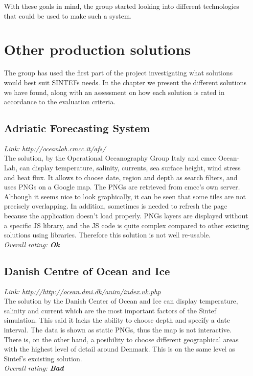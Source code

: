 \documentclass[11pt,a4paper,titlepage,oneside]{report}
\begin{document}
With these goals in mind, the group started looking into different technologies that could be used to make such a system.

\chapter{Other production solutions}
The group has used the first part of the project investigating what solutions would best suit SINTEFs needs. In the chapter we present the different solutions we have found, along with an assessment on how each solution is rated in accordance to the evaluation criteria. 

\section{Adriatic Forecasting System}
\emph{Link: \url{http://oceanlab.cmcc.it/afs/}} \\%
  The solution, by the Operational Oceanography Group Italy and cmcc Ocean-Lab, can display temperature, salinity, currents, sea surface height, wind stress and heat flux. It allows to choose date, region and depth as search filters, and uses PNGs on a Google map. The PNGs are retrieved from cmcc's own server.
  Although it seems nice to look graphically, it can be seen that some tiles are not precisely overlapping. In addition, sometimes is needed to refresh the page because the application doesn't load properly. PNGs layers are displayed without a specific JS library, and the JS code is quite complex compared to other existing solutions using libraries. Therefore this solution is not well re-usable.
\\ \emph{Overall rating: \textbf{Ok}}

\section{Danish Centre of Ocean and Ice}
  \emph{Link: \url{http://http://ocean.dmi.dk/anim/index.uk.php }} \\%
    The solution by the Danish Center of Ocean and Ice can display temperature, salinity and current which are the most important factors of the Sintef simulation. This said it lacks the ability to choose depth and specify a date interval. The data is shown as static PNGs, thus the map is not interactive. There is, on the other hand, a posibility to choose different geographical areas with the highest level of detail around Denmark. This is on the same level as Sintef's excisting solution.
  \\ \emph{Overall rating: \textbf{Bad}}
\end{document}
